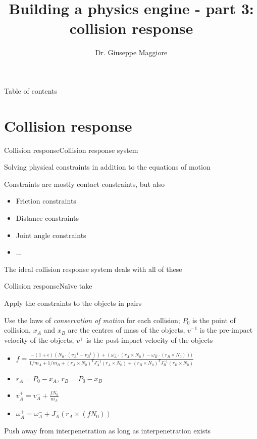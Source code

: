 \documentclass{beamer}
\title{Building a physics engine - part 3: collision response}
\author{Dr. Giuseppe Maggiore}
\institute{NHTV University of Applied Sciences \\ 
Breda, Netherlands}
\date{}
\begin{document}
\maketitle

\begin{frame}{Table of contents}
\tableofcontents
\end{frame}

\section{Collision response}
\begin{slide}{Collision response}{Collision response system}{
\item Solving physical constraints in addition to the equations of motion
\item Constraints are mostly contact constraints, but also
\begin{itemize}
\item Friction constraints
\item Distance constraints
\item Joint angle constraints
\item ...
\end{itemize}
\item The ideal collision response system deals with all of these
}\end{slide}

\begin{slide}{Collision response}{Naïve take}{
\item Apply the constraints to the objects in pairs
\item Use the laws of \textit{conservation of motion} for each collision; $P_0$ is the point of collision, $x_A$ and $x_B$ are the centres of mass of the objects, $v^{-1}$ is the pre-impact velocity of the objects, $v^+$ is the post-impact velocity of the objects
\begin{itemize}
\item $f = \frac{-(1 + \epsilon)(N_0 \cdot (v_A^{-1} - v_B^{-1})) + (\omega_A^- \cdot (r_A \times N_0) - \omega_B^- \cdot (r_B \times N_0)))}{1/m_A + 1/m_B + (r_A \times N_0)^T J_A^{-1} (r_A \times N_0) + (r_B \times N_0)^T J_B^{-1} (r_B \times N_0)}$
\item $r_A = P_0 - x_A$, $r_B = P_0 - x_B$
\item $v_A^+ = v_A^- + \frac{f N_0}{m_A}$
\item $\omega_A^+ = \omega_A^- + J_A^- (r_A \times (f N_0))$
\end{itemize}
\item Push away from interpenetration as long as interpenetration exists
}\end{slide}
\end{document}
